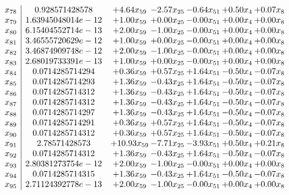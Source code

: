 \documentclass[8pt]{article}
\begin{document}
\[\begin{array}{c| c c@{\hskip 2pt} c@{\hskip 2pt} c@{\hskip 2pt} c@{\hskip 2pt} c@{\hskip 2pt} }
 x_{78}   &  0.928571428578 & +  4.64 x_{59} & -2.57 x_{25} & -0.64 x_{51} & +  0.50 x_{4} & +  0.07 x_{8}\\
 x_{79}   &  1.63945048014e-12 & +  1.00 x_{59} & +  0.00 x_{25} & -0.00 x_{51} & +  0.00 x_{4} & +  0.00 x_{8}\\
 x_{80}   &  6.15404552714e-13 & +  2.00 x_{59} & -1.00 x_{25} & -0.00 x_{51} & +  0.00 x_{4} & +  0.00 x_{8}\\
 x_{81}   &  3.46555720629e-12 & +  1.00 x_{59} & +  0.00 x_{25} & -0.00 x_{51} & +  0.00 x_{4} & +  0.00 x_{8}\\
 x_{82}   &  3.46874909748e-12 & +  2.00 x_{59} & -1.00 x_{25} & -0.00 x_{51} & +  0.00 x_{4} & +  0.00 x_{8}\\
 x_{83}   &  2.68019733391e-13 & +  1.00 x_{59} & +  0.00 x_{25} & -0.00 x_{51} & +  0.00 x_{4} & +  0.00 x_{8}\\
 x_{84}   &  0.0714285714294 & +  0.36 x_{59} & +  0.57 x_{25} & +  1.64 x_{51} & -0.50 x_{4} & -0.07 x_{8}\\
 x_{85}   &  0.0714285714293 & +  1.36 x_{59} & -0.43 x_{25} & +  1.64 x_{51} & -0.50 x_{4} & -0.07 x_{8}\\
 x_{86}   &  0.0714285714312 & +  1.36 x_{59} & -0.43 x_{25} & +  1.64 x_{51} & -0.50 x_{4} & -0.07 x_{8}\\
 x_{87}   &  0.0714285714312 & +  1.36 x_{59} & -0.43 x_{25} & +  1.64 x_{51} & -0.50 x_{4} & -0.07 x_{8}\\
 x_{88}   &  0.0714285714297 & +  1.36 x_{59} & -0.43 x_{25} & +  1.64 x_{51} & -0.50 x_{4} & -0.07 x_{8}\\
 x_{89}   &  0.0714285714291 & +  0.36 x_{59} & +  0.57 x_{25} & +  1.64 x_{51} & -0.50 x_{4} & -0.07 x_{8}\\
 x_{90}   &  0.0714285714312 & +  0.36 x_{59} & +  0.57 x_{25} & +  1.64 x_{51} & -0.50 x_{4} & -0.07 x_{8}\\
 x_{91}   &  2.78571428573 & + 10.93 x_{59} & -7.71 x_{25} & -3.93 x_{51} & +  0.50 x_{4} & +  0.21 x_{8}\\
 x_{92}   &  0.0714285714312 & +  1.36 x_{59} & -0.43 x_{25} & +  1.64 x_{51} & -0.50 x_{4} & -0.07 x_{8}\\
 x_{93}   &  2.80381273754e-12 & +  2.00 x_{59} & -1.00 x_{25} & -0.00 x_{51} & +  0.00 x_{4} & +  0.00 x_{8}\\
 x_{94}   &  0.0714285714315 & +  1.36 x_{59} & -0.43 x_{25} & +  1.64 x_{51} & -0.50 x_{4} & -0.07 x_{8}\\
 x_{95}   &  2.71124392778e-13 & +  2.00 x_{59} & -1.00 x_{25} & -0.00 x_{51} & +  0.00 x_{4} & +  0.00 x_{8}\\

\end{array}\]
\end{document}
